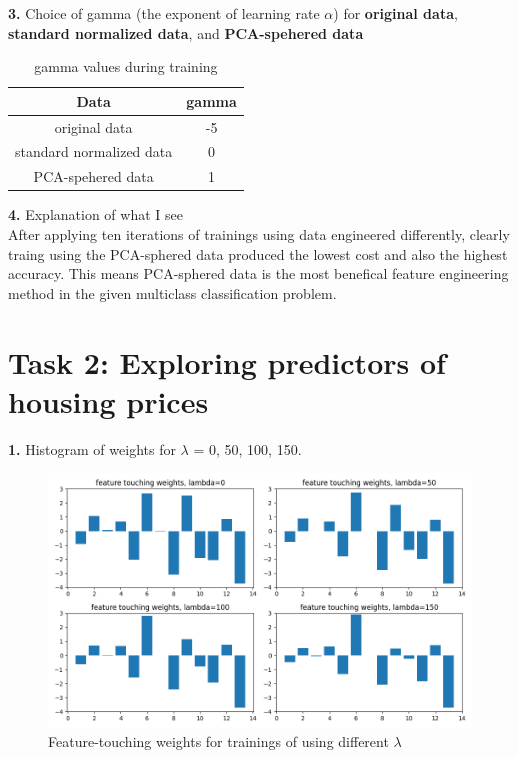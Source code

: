 \textbf{3.} Choice of gamma (the exponent of learning rate $\alpha$) for \textbf{original data}, \textbf{standard normalized data}, and \textbf{PCA-spehered data}

\begin{table}[H]
    \centering
    \begin{tabular}{|c|c|}
    \hline
         Data &  gamma  \\
        \hline
         original data & -5 \\
         standard normalized data & 0   \\
         PCA-spehered data & 1   \\
        \hline
    \end{tabular}
    \caption{gamma values during training}
    \label{tab:gamma}
\end{table}

\textbf{4.} Explanation of what I see \\
After applying ten iterations of trainings using data engineered differently, clearly traing using the PCA-sphered data produced the lowest cost and also the highest accuracy. This means PCA-sphered data is the most benefical feature engineering method in the given multiclass classification problem.




\newpage
\section*{\textbf{Task 2: Exploring predictors of housing prices }}



\textbf{1.} Histogram of weights for $\lambda$ = 0, 50, 100, 150.

\begin{figure}[H]
    \centering
    \includegraphics[width=120mm]{task2-weights.png}
    \caption{Feature-touching weights for trainings of using different $\lambda$}
    \label{fig:task2-weights}
\end{figure}


